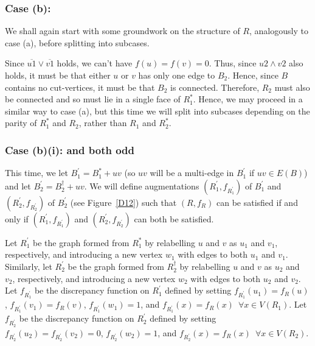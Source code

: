 \documentclass{article}
\newtheorem{Proof of Theorem}{Proof of Theorem}
\begin{document}
\subsubsection*{Case (b): }





We shall again start with some groundwork on the structure of $R$,
analogously to case (a),
before splitting into subcases.

Since $\overline{u1} \lor \overline{v1}$ holds,
we can't have $f(u) = f(v) =0$.
Thus, since $u2 \land v2$ also holds,
it must be that either $u$ or $v$ has only one edge to $B_{2}$.
Hence, since $B$ contains no cut-vertices,
it must be that $B_{2}$ is connected.
Therefore, $R_{2}$ must also be connected 
and so must lie in a single face of $R_{1}^{*}$.
Hence, we may proceed in a similar way to case (a),
but this time we will split into subcases depending on the parity of $R_{1}^{*}$ and $R_{2}$,
rather than $R_{1}$ and $R_{2}^{*}$. 





\subsubsection*{Case (b)(i): 
 and  both odd}





This time,
we let $B_{1}^{\prime} = B_{1}^{*} + uv$
(so $uv$ will be a multi-edge in $B_{1}^{\prime}$ if $uv \in E(B)$)
and let $B_{2}^{\prime} = B_{2}^{\dag} + uv$.
We will define augmentations
$(R_{1}^{\prime}, f_{R_{1}^{\prime}})$ of $B_{1}^{\prime}$
and $(R_{2}^{\prime}, f_{R_{2}^{\prime}})$ of $B_{2}^{\prime}$
(see Figure~\ref{D12})
such that $(R,f_{R})$ can be satisfied if and only if
$\left( R_{1}^{\prime},f_{R_{1}^{\prime}} \right)$ and $\left( R_{2}^{\prime},f_{R_{2}^{\prime}} \right)$ 
can both be satisfied.

Let $R_{1}^{\prime}$ be the graph formed from $R_{1}^{*}$
by relabelling $u$ and $v$ as $u_{1}$ and $v_{1}$, respectively,
and introducing a new vertex $w_{1}$ with edges to both $u_{1}$ and $v_{1}$.
Similarly, let $R_{2}^{\prime}$ be the graph formed from $R_{2}^{\dag}$
by relabelling $u$ and $v$ as $u_{2}$ and~$v_{2}$, respectively,
and introducing a new vertex $w_{2}$ with edges to both $u_{2}$ and $v_{2}$.
Let $f_{R_{1}^{\prime}}$ be the discrepancy function on $R_{1}^{\prime}$ defined by setting
$f_{R_{1}^{\prime}}(u_{1})=f_{R}(u)$,
$f_{R_{1}^{\prime}}(v_{1})=f_{R}(v)$,
$f_{R_{1}^{\prime}}(w_{1})=1$, 
and $f_{R_{1}^{\prime}}(x)=f_{R}(x)$~$\forall x \in V(R_{1})$.
Let $f_{R_{2}^{\prime}}$ be the discrepancy function on $R_{2}^{\prime}$ defined by setting
$f_{R_{2}^{\prime}}(u_{2})=f_{R_{2}^{\prime}}(v_{2})=0$,
$f_{R_{2}^{\prime}}(w_{2})=1$, and $f_{R_{2}^{\prime}}(x)=f_{R}(x)$~$\forall x \in V(R_{2})$.
\end{document}
